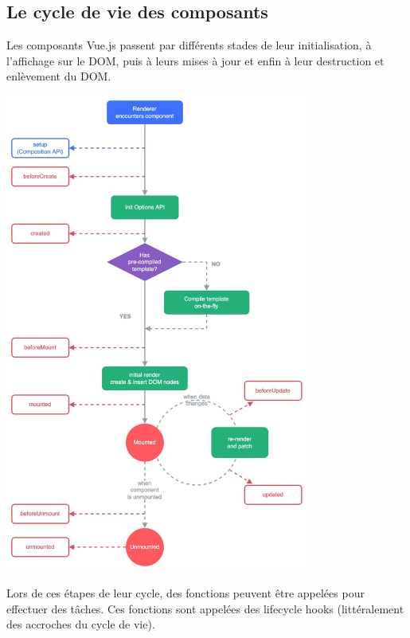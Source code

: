\documentclass{article}
\begin{document}
\subsection{Le cycle de vie des composants}
Les composants {\color{monOrange}Vue.js} passent par différents stades de leur initialisation, à l'affichage sur le DOM, puis à leurs mises à jour et enfin à leur destruction et enlèvement du DOM.
\begin{center}
\includegraphics[width=10cm]{images/image09.png}
\end{center}

Lors de ces étapes de leur cycle, des fonctions peuvent être appelées pour effectuer des tâches. Ces fonctions sont appelées des {\color{monOrange}lifecycle hooks} (littéralement des accroches du cycle de vie).
\end{document}
